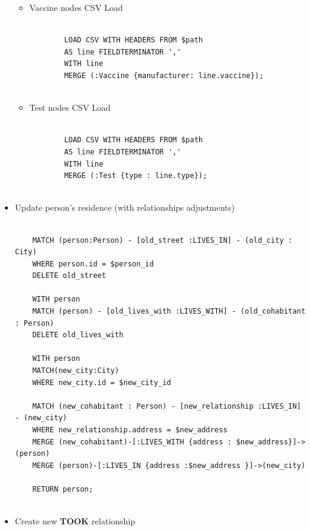 \documentclass{article}[IEEEtran]
\begin{document}
\begin{itemize}
\begin{itemize}
\begin{lstlisting}
        \end{lstlisting}
        
        \item Vaccine nodes CSV Load
        
        \begin{lstlisting}
        
        LOAD CSV WITH HEADERS FROM $path
        AS line FIELDTERMINATOR ','
        WITH line
        MERGE (:Vaccine {manufacturer: line.vaccine});
                
        \end{lstlisting}
        
        \item Test nodes CSV Load
        
        \begin{lstlisting}
        
        LOAD CSV WITH HEADERS FROM $path
        AS line FIELDTERMINATOR ','
        WITH line
        MERGE (:Test {type : line.type});
                
        \end{lstlisting}

    \end{itemize}
    
    \item Update person’s residence (with relationships adjustments) 
    
    \begin{lstlisting}
    
    MATCH (person:Person) - [old_street :LIVES_IN] - (old_city : City)
    WHERE person.id = $person_id
    DELETE old_street

    WITH person
    MATCH (person) - [old_lives_with :LIVES_WITH] - (old_cohabitant : Person)
    DELETE old_lives_with

    WITH person
    MATCH(new_city:City)
    WHERE new_city.id = $new_city_id

    MATCH (new_cohabitant : Person) - [new_relationship :LIVES_IN] - (new_city)
    WHERE new_relationship.address = $new_address
    MERGE (new_cohabitant)-[:LIVES_WITH {address : $new_address}]->(person)
    MERGE (person)-[:LIVES_IN {address :$new_address }]->(new_city)

    RETURN person;
    
    \end{lstlisting}
    
    \item Create new \textbf{TOOK} relationship 
    

\end{itemize}
\end{document}

